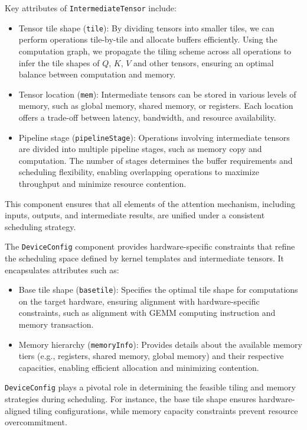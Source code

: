 Key attributes of \texttt{IntermediateTensor} include:
\begin{itemize}[noitemsep,topsep=0pt]
    \item Tensor tile shape (\texttt{tile}): By dividing tensors into smaller tiles, we can perform operations tile-by-tile and allocate buffers efficiently. Using the computation graph, we propagate the tiling scheme across all operations to infer the tile shapes of $Q$, $K$, $V$ and other tensors, ensuring an optimal balance between computation and memory.
    \item Tensor location (\texttt{mem}): Intermediate tensors can be stored in various levels of memory, such as global memory, shared memory, or registers. Each location offers a trade-off between latency, bandwidth, and resource availability. 
    \item Pipeline stage (\texttt{pipelineStage}): Operations involving intermediate tensors are divided into multiple pipeline stages, such as memory copy and computation. The number of stages determines the buffer requirements and scheduling flexibility, enabling overlapping operations to maximize throughput and minimize resource contention.
\end{itemize}
This component ensures that all elements of the attention mechanism, including inputs, outputs, and intermediate results, are unified under a consistent scheduling strategy.

The \texttt{DeviceConfig} component provides hardware-specific constraints that refine the scheduling space defined by kernel templates and intermediate tensors. It encapsulates attributes such as:
\begin{itemize}[noitemsep,topsep=0pt]
    \item Base tile shape (\texttt{basetile}): Specifies the optimal tile shape for computations on the target hardware, ensuring alignment with hardware-specific constraints, such as alignment with GEMM computing instruction and memory transaction.
    \item Memory hierarchy (\texttt{memoryInfo}): Provides details about the available memory tiers (e.g., registers, shared memory, global memory) and their respective capacities, enabling efficient allocation and minimizing contention.

\end{itemize}

\texttt{DeviceConfig} plays a pivotal role in determining the feasible tiling and memory strategies during scheduling. For instance, the base tile shape ensures hardware-aligned tiling configurations, while memory capacity constraints prevent resource overcommitment.

